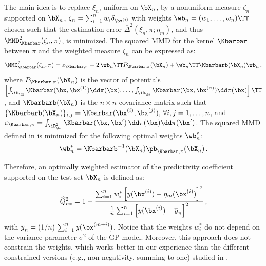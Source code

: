 The main idea is to replace $\xi_n$, uniform on $\bX_n$, by a nonuniform measure $\zeta_n$ supported on $\bX_n$, $\zeta_n = \sum_{i=1}^n w_i \delta_{\bx^{(i)}}$ with weights $\wb_n = (w_1,\ldots,w_n)\TT$ chosen such that the estimation error $\overline{\Delta}^2(\xi_n,\pi;\eta_m)$, and thus $\MMD_{\Kbarbar}^2(\zeta_n,\pi)$, is minimized. 
The squared MMD for the kernel $\Kbarbar$ between $\pi$ and the weighted measure $\zeta_n$ can be expressed as:  
\begin{equation}
    \MMD_{\Kbarbar}^2(\zeta_n,\pi) = \varepsilon_{\Kbarbar, \pi} - 2\,\wb_n\TT P_{\Kbarbar, \pi}(\bX_n) + \wb_n\TT\Kbarbarb(\bX_n)\wb_n \,,
    \label{eq:mmd2_validation}
\end{equation}
where $P_{\Kbarbar, \pi}(\bX_n)$ is the vector of potentials $\left[\int_{\iD_\bx} \Kbarbar(\bx, \bx^{(1)}) \dd \pi(\bx), \dots, \int_{\iD_\bx} \Kbarbar(\bx, \bx^{(n)}) \dd \pi(\bx)\right]\TT$, 
and $\Kbarbarb(\bX_n)$ is the $n \times n$ covariance matrix such that $\{\Kbarbarb(\bX_n)\}_{i,j}=\Kbarbar(\bx^{(i)},\bx^{(j)}), \, \forall i,j=1,\ldots,n$, 
and $\varepsilon_{\Kbarbar, \pi}=\int_{\iD_\bx^2} \Kbarbar(\bx,\bx')\,\dd\pi(\bx)\dd\pi(\bx')$.
%
The squared MMD defined in  is minimized for the following optimal weights $\wb_n^*$: 
\begin{equation}
    \label{Eq:weights}
    \wb_n^* = \Kbarbarb^{-1}(\bX_n)\pb_{\Kbarbar, \pi}(\bX_n) \,.
\end{equation}

Therefore, an optimally weighted estimator of the predictivity coefficient supported on the test set $\bX_n$ is defined as: 
\begin{equation}
    \widehat Q_{n*}^2 = 1 - \frac{\sum_{i=1}^n w_i^* \left[ y(\bx^{(i)})-\eta_m(\bx^{(i)})\right]^2}{\frac1n \sum_{i=1}^n \left[y(\bx^{(i)})-\overline{y}_n\right]^2} \,,
    \label{Q2-est*}
\end{equation}
with $\overline{y}_n=(1/n)\,\sum_{i=1}^n y(\bx^{(m+i)})$.
Notice that the weights $w_i^*$ do not depend on the variance parameter $\sigma^2$ of the GP model. 
Moreover, this approach does not constrain the weights, which works better in our experience than the different constrained versions (e.g., non-negativity, summing to one) studied in \citet{pronzato_rendas_2021}. 

